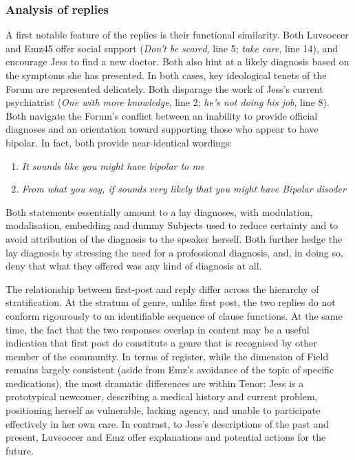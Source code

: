 \documentclass{article}
\begin{document}
\subsubsection{Analysis of replies} \label{sect:qual-reply-analysis}

A first notable feature of the replies is their functional similarity. Both Luvsoccer and Emz45 offer social support (\emph{Don't be scared}, line 5; \emph{take care}, line 14), and encourage Jess to find a new doctor. Both also hint at a likely diagnosis based on the symptoms she has presented. In both cases, key ideological tenets of the Forum are represented delicately. Both disparage the work of Jess's current psychiatrist (\emph{One with more knowledge}, line 2; \emph{he's not doing his job}, line 8). Both navigate the Forum's conflict between an inability to provide official diagnoses and an orientation toward supporting those who appear to have bipolar. In fact, both provide near-identical wordings:

\begin{enumerate}
\item \emph{It sounds like you might have bipolar to me}
\item \emph{From what you say, if sounds very likely that you might have Bipolar disoder}
\end{enumerate}
%
Both statements essentially amount to a lay diagnoses, with modulation, modalisation, embedding and dummy Subjects used to reduce certainty and to avoid attribution of the diagnosis to the speaker herself. Both further hedge the lay diagnosis by stressing the need for a professional diagnosis, and, in doing so, deny that what they offered was any kind of diagnosis at all.

The relationship between first-post and reply differ across the hierarchy of stratification. At the stratum of genre, unlike first post, the two replies do not conform rigourously to an identifiable sequence of clause functions. At the same time, the fact that the two responses overlap in content may be a useful indication that first post do constitute a genre that is recognised by other member of the community. In terms of register, while the dimension of Field remains largely consistent (aside from Emz's avoidance of the topic of specific medications), the most dramatic differences are within Tenor: Jess is a prototypical newcomer, describing a medical history and current problem, positioning herself as vulnerable, lacking agency, and unable to participate effectively in her own care. In contrast, to Jess's descriptions of the past and present, Luvsoccer and Emz offer explanations and potential actions for the future. 
\end{document}
